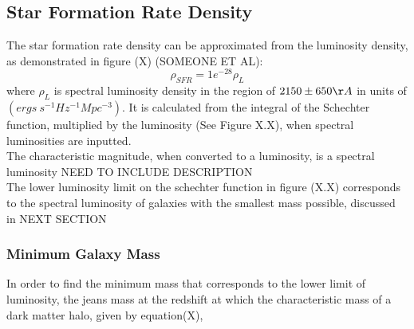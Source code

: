 \documentclass[pdf,color]{UoBnote}
\begin{document}

\subsection{Star Formation Rate Density}
The star formation rate density can be approximated from the luminosity density, as demonstrated in figure (X) (SOMEONE ET AL):
\begin{equation}
\rho_{SFR}=1e^{-28} \rho_L
\end{equation}
where $\rho_L$ is spectral luminosity density in the region of $2150\pm 650 \AA$ in units of $(ergs \ s^{-1} Hz^{-1} Mpc^{-3})$. It is calculated from the integral of the Schechter function, multiplied by the luminosity (See Figure X.X), when spectral luminosities are inputted.\\ 
\newline 
The characteristic magnitude, when converted to a luminosity, is a spectral luminosity NEED TO INCLUDE DESCRIPTION \\
\newline
The lower luminosity limit on the schechter function in figure (X.X) corresponds to the spectral luminosity of galaxies with the smallest mass possible, discussed in NEXT SECTION
\subsubsection{Minimum Galaxy Mass}
In order to find the minimum mass that corresponds to the lower limit of luminosity, the jeans mass at the redshift at which the characteristic mass of a dark matter halo, given by equation(X),
\end{document}
